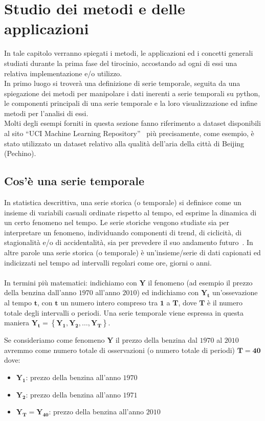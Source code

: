 \section{Studio dei metodi e delle applicazioni}
In tale capitolo verranno spiegati i metodi, le applicazioni ed i concetti 
generali studiati durante la prima fase del tirocinio, accostando ad ogni 
di essi una relativa implementazione e/o utilizzo.\\
In primo luogo si troverà una definizione di serie temporale, seguita da
una spiegazione dei metodi per manipolare i dati inerenti a serie temporali 
su python, le componenti principali di una serie temporale e la loro visualizzazione
ed infine metodi per l'analisi di essi.\\
Molti degli esempi forniti in questa sezione fanno riferimento a dataset disponibili
al sito ``UCI Machine Learning Repository''~\cite{dua:2019} più precisamente, come
esempio, è stato utilizzato un dataset relativo alla qualità dell'aria della città di
Beijing~\cite{dua:air_quality} (Pechino).
 
\subsection{Cos'è una serie temporale}
In statistica descrittiva, una serie storica (o temporale) si definisce come un insieme di variabili 
casuali ordinate rispetto al tempo, ed esprime la dinamica di un certo 
fenomeno nel tempo. Le serie storiche vengono studiate sia per 
interpretare un fenomeno, individuando componenti di trend, di ciclicità, 
di stagionalità e/o di accidentalità, sia per prevedere il suo 
andamento futuro~\cite{wiki:serie_storica}.
In altre parole una serie storica (o temporale) è un'insieme/serie di dati
capionati ed indicizzati nel tempo ad intervalli regolari come ore, giorni 
o anni.\\
\\
In termini più matematici: indichiamo con $\bm{Y}$ il fenomeno (ad esempio 
il prezzo della benzina dall'anno $1970$ all'anno $2010$) ed indichiamo con
$\bm{Y_t}$ un'ossevazione al tempo $\bm{t}$, con $\bm{t}$ un numero intero
compreso tra $\bm{1}$ a $\bm{T}$, dove $\bm{T}$ è il numero totale degli intervalli o 
periodi. Una serie temporale viene espressa in questa maniera 
$\bm{Y_t} = \left\{  \bm{Y_1}, \bm{Y_2}, \dots , \bm{Y_T}  \right\}$.

\begin{esempio} 
    Se consideriamo come fenomeno $\bm{Y}$ il prezzo della benzina dal $1970$ al $2010$
    avremmo come numero totale di osservazioni (o numero totale di periodi) 
    $\bm{T} = \bm{40}$ dove:
    \begin{itemize}
        \setlength\itemsep{-0.5em}
        \item $\bm{Y_1}$: prezzo della benzina all'anno $1970$
        \item $\bm{Y_2}$: prezzo della benzina all'anno $1971$
        \item $\bm{Y_T} = \bm{Y_{40}}$: prezzo della benzina all'anno $2010$
    \end{itemize}

\end{esempio}


